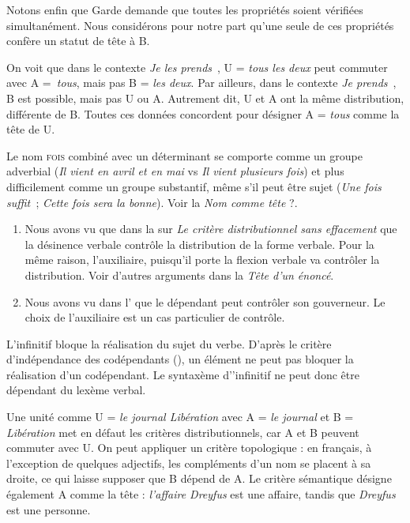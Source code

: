 {    Notons enfin que Garde demande que toutes les propriétés soient vérifiées simultanément. Nous considérons pour notre part qu’une seule de ces propriétés confère un statut de tête à B.


     On voit que dans le contexte \textit{Je les prends}~{\longrule}, U = \textit{tous les deux} peut commuter avec A =~\textit{tous}, mais pas B = \textit{les deux}. Par ailleurs, dans le contexte \textit{Je prends}~{\longrule}, B est possible, mais pas U ou A. Autrement dit, U et A ont la même distribution, différente de B. Toutes ces données concordent pour désigner A = \textit{tous} comme la tête de U.

     Le nom \textsc{fois} combiné avec un déterminant se comporte comme un groupe adverbial (\textit{Il vient en avril et en mai} vs \textit{Il vient plusieurs fois}) et plus difficilement comme un groupe substantif, même s’il peut être sujet (\textit{Une fois suffit~}; \textit{Cette fois sera la bonne}). Voir la  \textit{Nom comme tête} ?.

    \begin{enumerate}[label=\alph*.]
    \item Nous avons vu que dans la  sur \textit{Le critère distributionnel sans effacement} que la désinence verbale contrôle la distribution de la forme verbale. Pour la même raison, l’auxiliaire, puisqu’il porte la flexion verbale va contrôler la distribution. Voir d’autres arguments dans la  \textit{Tête d’un énoncé}.

    \item Nous avons vu dans l' que le dépendant peut contrôler son gouverneur. Le choix de l’auxiliaire est un cas particulier de contrôle.
    \end{enumerate}

     L’infinitif bloque la réalisation du sujet du verbe. D’après le critère d’indépendance des codépendants (), un élément ne peut pas bloquer la réalisation d’un codépendant. Le syntaxème d’’infinitif ne peut donc être dépendant du lexème verbal.

     Une unité comme U = \textit{le journal Libération} avec A = \textit{le journal} et B = \textit{Libération} met en défaut les critères distributionnels, car A et B peuvent commuter avec U. On peut appliquer un critère topologique : en français, à l’exception de quelques adjectifs, les compléments d’un nom se placent à sa droite, ce qui laisse supposer que B dépend de A. Le critère sémantique désigne également A comme la tête : \textit{l’affaire Dreyfus} est une affaire, tandis que \textit{Dreyfus} est une personne.

}
